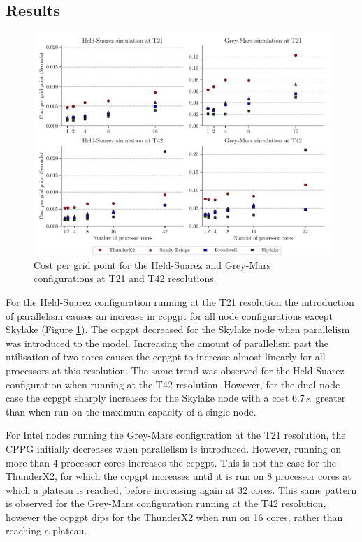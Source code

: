 \documentclass[a4paper,11pt]{report}
\begin{document}
\subsection{Results}
\begin{figure}[htbp]
\begin{center}
\includegraphics[width=1\textwidth]{img/cost-per-grid-point.pdf} 
\caption[Cost per grid point at T21 and T42 resoltuions]{Cost per grid point for the Held-Suarez and Grey-Mars configurations at T21 and T42 resolutions.}
\label{fig:cost-per-grid-point}
\end{center}
\end{figure}
For the Held-Suarez configuration running at the T21 resolution the introduction of parallelism causes an increase in \gls{ccpgpt} for all node configurations except Skylake (Figure \ref{fig:cost-per-grid-point}). The \gls{ccpgpt} decreased for the Skylake node when parallelism was introduced to the model. Increasing the amount of parallelism past the utilisation of two cores causes the \gls{ccpgpt} to increase almost linearly for all processors at this resolution. The same trend was observed for the Held-Suarez configuration when running at the T42 resolution. However, for the dual-node case the \gls{ccpgpt} sharply increases for the Skylake node with a cost 6.7$\times$ greater than when run on the maximum capacity of a single node.
\par
For Intel nodes running the Grey-Mars configuration at the T21 resolution, the CPPG initially decreases when parallelism is introduced. However, running on more than 4 processor cores increases the \gls{ccpgpt}. This is not the case for the ThunderX2, for which the \gls{ccpgpt} increases until it is run on 8 processor cores at which a plateau is reached, before increasing again at 32 cores. This same pattern is observed for the Grey-Mars configuration running at the T42 resolution, however the \gls{ccpgpt} dips for the ThunderX2 when run on 16 cores, rather than reaching a plateau. 
\end{document}
